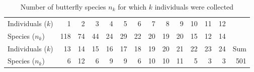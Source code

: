 
\begin{table}[ht]
\centering
\caption{Number of butterfly species $n_k$ for which $k$ individuals were collected} \label{tab:buttertab}
\begin{tabular}{l|rrrrrrrrrrrrr}
   \hline
Individuals ($k$) & 1 & 2 & 3 & 4 & 5 & 6 & 7 & 8 & 9 & 10 & 11 & 12 \\
Species ($n_k$)   & 118 &  74 &  44 &  24 &  29 &  22 &  20 &  19 &  20 &  15 &  12 &  14 \\
   \hline \hline
Individuals ($k$) & 13 & 14 & 15 & 16 & 17 & 18 & 19 & 20 & 21 & 22 & 23 & 24 & Sum \\ 
Species ($n_k$)   &   6 &  12 &   6 &   9 &   9 &   6 &  10 &  10 &  11 &   5 &   3 &   3 & 501 \\ 
   \hline
  \end{tabular}
\end{table}

 
